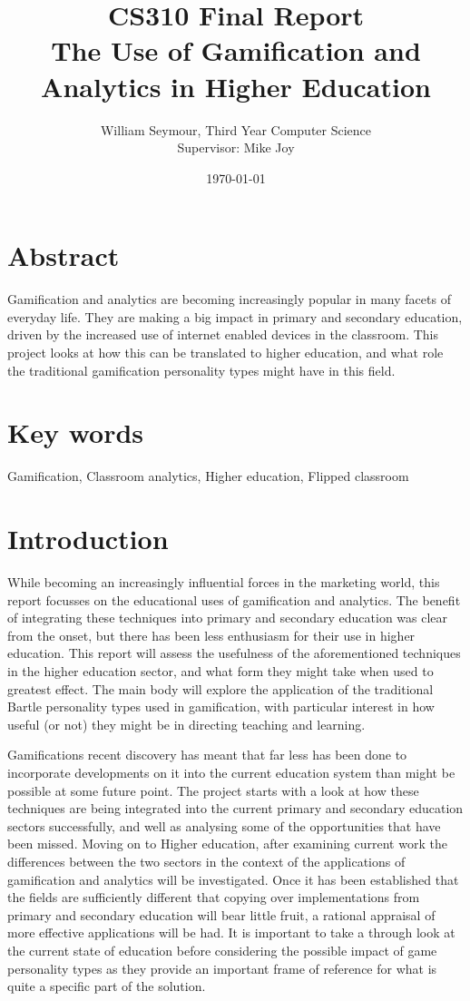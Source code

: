 \documentclass{article}
\title{CS310 Final Report \\ The Use of Gamification and Analytics in Higher Education}
\author{William Seymour, Third Year Computer Science \\ Supervisor: Mike Joy}
\date{\today}
\begin{document}
\maketitle
\clearpage
\tableofcontents

\section{Abstract}
Gamification and analytics are becoming increasingly popular in many facets of everyday life. They are making a big impact in primary and secondary education, driven by the increased use of internet enabled devices in the classroom. This project looks at how this can be translated to higher education, and what role the traditional gamification personality types might have in this field.

\section{Key words}
Gamification, Classroom analytics, Higher education, Flipped classroom

\section{Introduction}
While becoming an increasingly influential forces in the marketing world, this report focusses on the educational uses of gamification and analytics. The benefit of integrating these techniques into primary and secondary education was clear from the onset, but there has been less enthusiasm for their use in higher education. This report will assess the usefulness of the aforementioned techniques in the higher education sector, and what form they might take when used to greatest effect. The main body will explore the application of the traditional Bartle personality types used in gamification, with particular interest in how useful (or not) they might be in directing teaching and learning.

Gamifications recent discovery has meant that far less has been done to incorporate developments on it into the current education system than might be possible at some future point. The project starts with a look at how these techniques are being integrated into the current primary and secondary education sectors successfully, and well as analysing some of the opportunities that have been missed. Moving on to Higher education, after examining current work the differences between the two sectors in the context of the applications of gamification and analytics will be investigated. Once it has been established that the fields are sufficiently different that copying over implementations from primary and secondary education will bear little fruit, a rational appraisal of more effective applications will be had. It is important to take a through look at the current state of education before considering the possible impact of game personality types as they provide an important frame of reference for what is quite a specific part of the solution.
\end{document}
